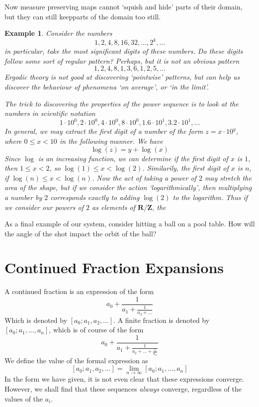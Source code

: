 \documentclass[12pt]{report}
\theoremstyle{plain}
\newtheorem*{example}{Example}
\theoremstyle{definition}
\begin{document}
Now measure preserving maps cannot `squish and hide' parts of their domain, but they can still keepparts of the domain too still. 

\begin{example}
    Consider the numbers
    \[ 1, 2, 4, 8, 16, 32, \dots, 2^k, \dots \]
    in particular, take the most significant digits of these numbers. Do these digits follow some sort of regular pattern? Perhaps, but it is not an obvious pattern
    \[ 1, 2, 4, 8, 1, 3, 6, 1, 2, 5, \dots \]
    Ergodic theory is not good at discovering `pointwise' patterns, but can help us discover the behaviour of phenomena `on average', or `in the limit'.

    The trick to discovering the properties of the power sequence is to look at the numbers in scientific notation
    \[ 1 \cdot 10^0, 2 \cdot 10^0, 4 \cdot 10^0, 8 \cdot 10^0, 1.6 \cdot 10^1, 3.2 \cdot 10^1, \dots \]
    In general, we may extract the first digit of a number of the form $z = x \cdot 10^y$, where $0 \leq x < 10$ in the following manner. We have
    \[ \log(z) = y + \log(x) \]
    Since $\log$ is an increasing function, we can determine if the first digit of $x$ is $1$, then $1 \leq x < 2$, so $\log(1) \leq x < \log(2)$. Similarily, the first digit of $x$ is $n$, if $\log(n) \leq x < \log(n)$. Now the act of taking a power of $2$ may stretch the area of the shape, but if we consider the action `logarithmically', then multiplying a number by $2$ corresponds exactly to adding $\log(2)$ to the logarithm. Thus if we consider our powers of $2$ as elements of $\mathbf{R}/\mathbf{Z}$, the 
\end{example}

As a final example of our system, consider hitting a ball on a pool table. How will the angle of the shot impact the orbit of the ball?

\section{Continued Fraction Expansions}

A continued fraction is an expression of the form
%
\[ a_0 + \frac{1}{a_1 + \frac{1}{a_2 + \dots}} \]
%
Which is denoted by $[a_0; a_1, a_2, \dots]$. A finite fraction is denoted by $[a_0; a_1, \dots, a_n]$, which is of course of the form
%
\[ a_0 + \frac{1}{a_1 + \frac{1}{a_2 + \dots + \frac{1}{a_n}}} \]
%
We define the value of the formal expression as
%
\[ [a_0; a_1, a_2, \dots] = \lim_{n \to \infty} [a_0; a_1, \dots, a_n] \]
%
In the form we have given, it is not even clear that these expressions converge. However, we shall find that these sequences {\it always} converge, regardless of the values of the $a_i$.
\end{document}
